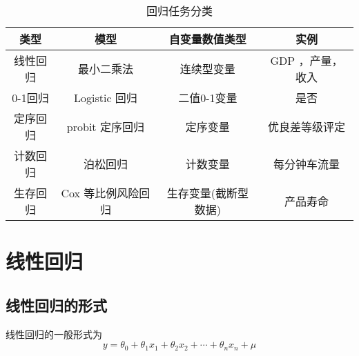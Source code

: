 \documentclass[withoutpreface]{cumcmthesis}
\begin{document}
\begin{table}[H]
  \centering
  \caption{回归任务分类}
  \begin{tabular}{|c|c|c|c|}
    \hline
    \textcolor[rgb]{ .267,  .329,  .416}{\textbf{类型}} & \textcolor[rgb]{ .267,  .329,  .416}{\textbf{模型}} & \textcolor[rgb]{ .267,  .329,  .416}{\textbf{自变量数值类型}} & \textcolor[rgb]{ .267,  .329,  .416}{\textbf{实例}} \bigstrut \\
    \hline
    \rowcolor[rgb]{ .851,  .882,  .949} 线性回归          & 最小二乘法                                             & 连续型变量                                                  & GDP ，产量，收入 \bigstrut                                        \\
    \hline
    \rowcolor[rgb]{ .851,  .882,  .949} 0-1回归         & Logistic 回归                                       & 二值0-1变量                                                & 是否 \bigstrut                                                \\
    \hline
    \rowcolor[rgb]{ .851,  .882,  .949} 定序回归          & probit 定序回归                                       & 定序变量                                                   & 优良差等级评定 \bigstrut                                           \\
    \hline
    \rowcolor[rgb]{ .851,  .882,  .949} 计数回归          & 泊松回归                                              & 计数变量                                                   & 每分钟车流量 \bigstrut                                            \\
    \hline
    \rowcolor[rgb]{ .851,  .882,  .949} 生存回归          & Cox 等比例风险回归                                       & 生存变量(截断型数据)                                            & 产品寿命 \bigstrut                                              \\
    \hline
  \end{tabular}
\end{table}

\section{线性回归}

\subsection{线性回归的形式}
线性回归的一般形式为
\begin{equation}\label{Eq:1}
  y = \theta_0 + \theta_1x_1+\theta_2x_2+\cdots+\theta_nx_n+ \mu
\end{equation}
\end{document}
